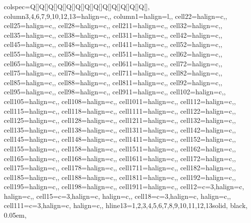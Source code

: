 \begin{table}
\centering
\begin{talltblr}[         %
entry=none,label=none,
note{}={+ p \num{< 0.1}, * p \num{< 0.05}, ** p \num{< 0.01}, *** p \num{< 0.001}},
]                     %
{                     %
colspec={Q[]Q[]Q[]Q[]Q[]Q[]Q[]Q[]Q[]Q[]Q[]Q[]Q[]},
column{3,4,6,7,9,10,12,13}={}{halign=c,},
column{1}={}{halign=l,},
cell{2}{2}={}{halign=c,},
cell{2}{5}={}{halign=c,},
cell{2}{8}={}{halign=c,},
cell{2}{11}={}{halign=c,},
cell{3}{2}={}{halign=c,},
cell{3}{5}={}{halign=c,},
cell{3}{8}={}{halign=c,},
cell{3}{11}={}{halign=c,},
cell{4}{2}={}{halign=c,},
cell{4}{5}={}{halign=c,},
cell{4}{8}={}{halign=c,},
cell{4}{11}={}{halign=c,},
cell{5}{2}={}{halign=c,},
cell{5}{5}={}{halign=c,},
cell{5}{8}={}{halign=c,},
cell{5}{11}={}{halign=c,},
cell{6}{2}={}{halign=c,},
cell{6}{5}={}{halign=c,},
cell{6}{8}={}{halign=c,},
cell{6}{11}={}{halign=c,},
cell{7}{2}={}{halign=c,},
cell{7}{5}={}{halign=c,},
cell{7}{8}={}{halign=c,},
cell{7}{11}={}{halign=c,},
cell{8}{2}={}{halign=c,},
cell{8}{5}={}{halign=c,},
cell{8}{8}={}{halign=c,},
cell{8}{11}={}{halign=c,},
cell{9}{2}={}{halign=c,},
cell{9}{5}={}{halign=c,},
cell{9}{8}={}{halign=c,},
cell{9}{11}={}{halign=c,},
cell{10}{2}={}{halign=c,},
cell{10}{5}={}{halign=c,},
cell{10}{8}={}{halign=c,},
cell{10}{11}={}{halign=c,},
cell{11}{2}={}{halign=c,},
cell{11}{5}={}{halign=c,},
cell{11}{8}={}{halign=c,},
cell{11}{11}={}{halign=c,},
cell{12}{2}={}{halign=c,},
cell{12}{5}={}{halign=c,},
cell{12}{8}={}{halign=c,},
cell{12}{11}={}{halign=c,},
cell{13}{2}={}{halign=c,},
cell{13}{5}={}{halign=c,},
cell{13}{8}={}{halign=c,},
cell{13}{11}={}{halign=c,},
cell{14}{2}={}{halign=c,},
cell{14}{5}={}{halign=c,},
cell{14}{8}={}{halign=c,},
cell{14}{11}={}{halign=c,},
cell{15}{2}={}{halign=c,},
cell{15}{5}={}{halign=c,},
cell{15}{8}={}{halign=c,},
cell{15}{11}={}{halign=c,},
cell{16}{2}={}{halign=c,},
cell{16}{5}={}{halign=c,},
cell{16}{8}={}{halign=c,},
cell{16}{11}={}{halign=c,},
cell{17}{2}={}{halign=c,},
cell{17}{5}={}{halign=c,},
cell{17}{8}={}{halign=c,},
cell{17}{11}={}{halign=c,},
cell{18}{2}={}{halign=c,},
cell{18}{5}={}{halign=c,},
cell{18}{8}={}{halign=c,},
cell{18}{11}={}{halign=c,},
cell{19}{2}={}{halign=c,},
cell{19}{5}={}{halign=c,},
cell{19}{8}={}{halign=c,},
cell{19}{11}={}{halign=c,},
cell{1}{2}={c=3,}{halign=c, halign=c,},
cell{1}{5}={c=3,}{halign=c, halign=c,},
cell{1}{8}={c=3,}{halign=c, halign=c,},
cell{1}{11}={c=3,}{halign=c, halign=c,},
hline{13}={1,2,3,4,5,6,7,8,9,10,11,12,13}{solid, black, 0.05em},
}
\end{talltblr}
\end{table}

